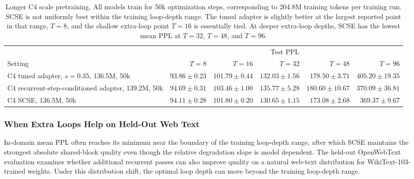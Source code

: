 \documentclass[letterpaper]{article} %
\newcommand{\SCSE}{\textsc{SCSE}}
\theoremstyle{remark}
\begin{document}
\begin{table}[t!]
	\centering
	\scriptsize
	\begin{tabular}{lrrrrr}
		\toprule
		                                                   & \multicolumn{5}{c}{Test PPL}                                                                                                             \\
		\cmidrule(lr){2-6}
		Setting                                            & $T=8$                        & $T=16$                   & $T=32$                   & $T=48$                   & $T=96$                   \\
		\midrule
		C4 tuned adapter, $s=0.35$, 136.5M, 50k            & $\mathbf{93.86\pm0.23}$      & $\mathbf{101.79\pm0.44}$ & $132.03\pm1.56$          & $178.50\pm3.71$          & $405.20\pm19.35$         \\
		C4 recurrent-step-conditioned adapter, 139.2M, 50k & $94.69\pm0.31$               & $103.46\pm1.00$          & $135.77\pm5.28$          & $180.60\pm10.67$         & $370.09\pm36.81$         \\
		C4 \SCSE{}, 136.5M, 50k                            & $94.11\pm0.28$               & $101.80\pm0.20$          & $\mathbf{130.65\pm1.15}$ & $\mathbf{173.08\pm2.68}$ & $\mathbf{369.37\pm9.67}$ \\
		\bottomrule
	\end{tabular}
	\caption{Longer C4 scale pretraining.  All models train for 50k optimization steps, corresponding to 204.8M training tokens per training run.  \SCSE{} is not uniformly best within the training loop-depth range.  The tuned adapter is slightly better at the largest reported point in that range, $T=8$, and the shallow extra-loop point $T=16$ is essentially tied.  At deeper extra-loop depths, \SCSE{} has the lowest mean PPL at $T=32$, $T=48$, and $T=96$.}
	\label{tab:add-c4-long50k}
\end{table}

\subsubsection{When Extra Loops Help on Held-Out Web Text}
\label{app:extra-loop-help-real}

In-domain mean PPL often reaches its minimum near the boundary of the training loop-depth range, after which \SCSE{} maintains the strongest absolute shared-block quality even though the relative degradation slope is model dependent.  The held-out OpenWebText evaluation examines whether additional recurrent passes can also improve quality on a natural web-text distribution for WikiText-103-trained weights.  Under this distribution shift, the optimal loop depth can move beyond the training loop-depth range.
\end{document}
